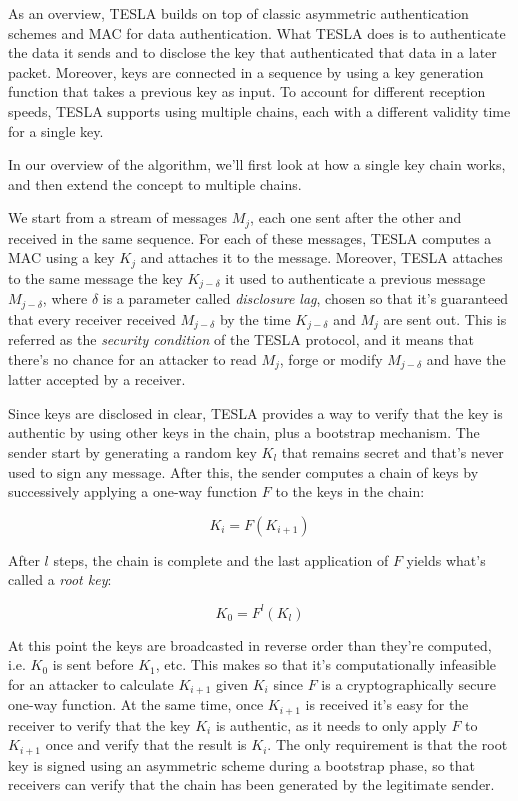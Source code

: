\par

As an overview, TESLA builds on top of classic asymmetric authentication schemes
and MAC for data authentication. What TESLA does is to authenticate the data it
sends and to disclose the key that authenticated that data in a later packet.
Moreover, keys are connected in a sequence by using a key generation function
that takes a previous key as input. To account for different reception speeds,
TESLA supports using multiple chains, each with a different validity time for a
single key.

In our overview of the algorithm, we'll first look at how a single key chain
works, and then extend the concept to multiple chains.

\par

We start from a stream of messages $M_j$, each one sent after the other and
received in the same sequence. For each of these messages, TESLA computes a MAC
using a key $K_j$ and attaches it to the message. Moreover, TESLA attaches to
the same message the key $K_{j-\delta}$ it used to authenticate a previous
message $M_{j-\delta}$, where $\delta$ is a parameter called \textit{disclosure
lag}, chosen so that it's guaranteed that every receiver received $M_{j-\delta}$
by the time $K_{j-\delta}$ and $M_j$ are sent out. This is referred as the
\textit{security condition} of the TESLA protocol, and it means that there's no
chance for an attacker to read $M_j$, forge or modify $M_{j-\delta}$ and have
the latter accepted by a receiver.

Since keys are disclosed in clear, TESLA provides a way to verify that the key
is authentic by using other keys in the chain, plus a bootstrap mechanism. The
sender start by generating a random key $K_l$ that remains secret and that's
never used to sign any message. After this, the sender computes a chain of keys
by successively applying a one-way function $F$ to the keys in the chain:

\[
  K_i = F(K_{i+1})
\]

After $l$ steps, the chain is complete and the last application of $F$ yields
what's called a \textit{root key}:

\[
  K_0 = F^l(K_l)
\]

At this point the keys are broadcasted in reverse order than they're computed,
i.e. $K_0$ is sent before $K_1$, etc. This makes so that it's computationally
infeasible for an attacker to calculate $K_{i+1}$ given $K_i$ since $F$ is a
cryptographically secure one-way function. At the same time, once $K_{i+1}$ is
received it's easy for the receiver to verify that the key $K_i$ is authentic,
as it needs to only apply $F$ to $K_{i+1}$ once and verify that the result is
$K_i$.  The only requirement is that the root key is signed using an asymmetric
scheme during a bootstrap phase, so that receivers can verify that the chain has
been generated by the legitimate sender.

